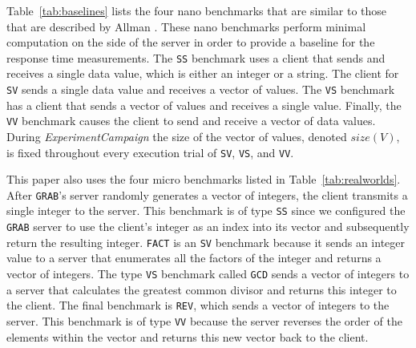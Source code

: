 \documentclass{sig-alternate}
\begin{document}

Table~\ref{tab:baselines} lists the four nano benchmarks that are
similar to those that are described by Allman \cite{allman-per}. These
nano benchmarks perform minimal computation on the side of the server
in order to provide a baseline for the response time measurements.
The \texttt{SS} benchmark uses a client that sends and receives a
single data value, which is either an integer or a string.  The client
for \texttt{SV} sends a single data value and receives a vector of
values.  The \texttt{VS} benchmark has a client that sends a vector of
values and receives a single value.  Finally, the \texttt{VV}
benchmark causes the client to send and receive a vector of data
values.  During {\em ExperimentCampaign} the size of the vector of
values, denoted $size(V)$, is fixed throughout every execution trial
of {\tt SV}, {\tt VS}, and {\tt VV}.







This paper also uses the four micro benchmarks listed in
Table~\ref{tab:realworlds}.  After \texttt{GRAB}'s server randomly
generates a vector of integers, the client transmits a single integer
to the server.  This benchmark is of type {\tt SS} since we configured
the {\tt GRAB} server to use the client's integer as an index into its
vector and subsequently return the resulting integer.  {\tt FACT} is
an {\tt SV} benchmark because it sends an integer value to a server
that enumerates all the factors of the integer and returns a vector of
integers.  The type {\tt VS} benchmark called {\tt GCD} sends a vector
of integers to a server that calculates the greatest common divisor
and returns this integer to the client.  The final benchmark is
\texttt{REV}, which sends a vector of integers to the server.  This
benchmark is of type {\tt VV} because the server reverses the order of
the elements within the vector and returns this new vector back to the
client.
\end{document}
